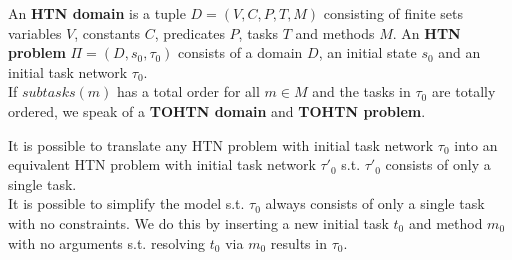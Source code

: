 \begin{definition} %
	An \textbf{HTN domain} is a tuple $D = (V, C, P, T, M)$ consisting of finite sets variables $V$, constants $C$, predicates $P$, tasks $T$ and methods $M$. An \textbf{HTN problem} $\Pi = (D, s_0, \tau_0)$ consists of a domain $D$, an initial state $s_0$ and an initial task network $\tau_0$. \\
	If $subtasks(m)$ has a total order for all $m \in M$ and the tasks in $\tau_0$ are totally ordered, we speak of a \textbf{TOHTN domain} and \textbf{TOHTN problem}.
\end{definition}
It is possible to translate any HTN problem with initial task network $\tau_0$ into an equivalent HTN problem with initial task network $\tau'_0$ s.t. $\tau'_0$ consists of only a single task. \\
It is possible to simplify the model s.t. $\tau_0$ always consists of only a single task with no constraints. We do this by inserting a new initial task $t_0$ and method $m_0$ with no arguments s.t. resolving $t_0$ via $m_0$ results in $\tau_0$.

